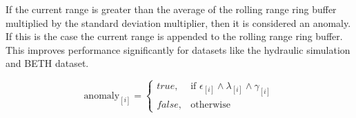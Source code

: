 If the current range is greater than the average of the rolling range ring buffer multiplied by the standard deviation multiplier, then it is considered an anomaly. If this is the case the current range is appended to the rolling range ring buffer. This improves performance significantly for datasets like the hydraulic simulation and BETH dataset.

\begin{equation}
    \label{eqn:mp_cumulative}
        \text{anomaly}_{[i]}= 
    \begin{cases}
        true,& \text{if } \epsilon_{[i]} \land \lambda_{[i]} \land \gamma_{[i]}\\
        false,              & \text{otherwise}
    \end{cases}
\end{equation}
